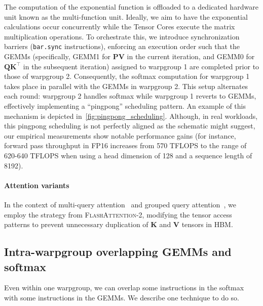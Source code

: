 The computation of the exponential function is offloaded to a dedicated hardware unit known as the multi-function unit. Ideally, we aim to have the exponential calculations occur concurrently while the Tensor Cores execute the matrix multiplication operations. To orchestrate this, we introduce synchronization barriers (\texttt{bar.sync} instructions), enforcing an execution order such that the GEMMs (specifically, GEMM1 for $\mathbf{P} \mathbf{V}$ in the current iteration, and GEMM0 for $\mathbf{Q} \mathbf{K}^\top$ in the subsequent iteration) assigned to warpgroup 1 are completed prior to those of warpgroup 2. Consequently, the softmax computation for warpgroup 1 takes place in parallel with the GEMMs in warpgroup 2. This setup alternates each round: warpgroup 2 handles softmax while warpgroup 1 reverts to GEMMs, effectively implementing a ``pingpong'' scheduling pattern. An example of this mechanism is depicted in~\cref{fig:pingpong_scheduling}. Although, in real workloads, this pingpong scheduling is not perfectly aligned as the schematic might suggest, our empirical measurements show notable performance gains (for instance, forward pass throughput in FP16 increases from 570 TFLOPS to the range of 620-640 TFLOPS when using a head dimension of 128 and a sequence length of 8192).

\paragraph{Attention variants} In the context of multi-query attention~\citep{shazeer2019fast} and grouped query attention~\citep{ainslie2023gqa}, we employ the strategy from \textsc{FlashAttention-2}, modifying the tensor access patterns to prevent unnecessary duplication of $\mathbf{K}$ and $\mathbf{V}$ tensors in HBM.

\subsection{Intra-warpgroup overlapping GEMMs and softmax}

Even within one warpgroup, we can overlap some instructions in the softmax with some instructions in the GEMMs. We describe one technique to do so.


